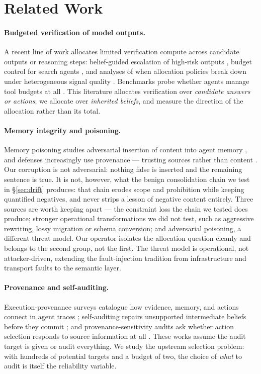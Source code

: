 \documentclass[11pt]{article}
\begin{document}
\section{Related Work}

\paragraph{Budgeted verification of model outputs.}
A recent line of work allocates limited verification compute across candidate
outputs or reasoning steps: belief-guided escalation of high-risk outputs
\citep{yuan2026belief}, budget control for search agents
\citep{fang2026budget}, and analyses of when allocation policies break down
under heterogeneous signal quality \citep{yang2026hetero}. Benchmarks probe
whether agents manage tool budgets at all \citep{wang2026allocbench,
lin2026bagen}. This literature allocates verification over \emph{candidate
answers or actions}; we allocate over \emph{inherited beliefs}, and measure
the direction of the allocation rather than its total.

\paragraph{Memory integrity and poisoning.}
Memory poisoning studies adversarial insertion of content into agent memory
\citep{dash2026untrusted, xie2026memevobench}, and defenses increasingly use
provenance --- trusting sources rather than content \citep{singh2026belief}.
Our corruption is not adversarial: nothing false is inserted and the remaining
sentence is true. It is not, however, what the benign consolidation chain we
test in \S\ref{sec:drift} produces: that chain erodes scope and prohibition
while keeping quantified negatives, and never strips a lesson of negative
content entirely. Three sources are worth keeping apart --- the constraint loss
the chain we tested does produce; stronger operational transformations we did
not test, such as aggressive rewriting, lossy migration or schema conversion;
and adversarial poisoning, a different threat model. Our operator isolates the
allocation question cleanly and belongs to the second group, not the first. The
threat model is operational, not attacker-driven, extending the fault-injection tradition
\citep{tan2026agentchaos} from infrastructure and transport faults to the
semantic layer.

\paragraph{Provenance and self-auditing.}
Execution-provenance surveys catalogue how evidence, memory, and actions
connect in agent traces \citep{wang2026traces}; self-auditing repairs
unsupported intermediate beliefs before they commit \citep{yuan2026verify};
and provenance-sensitivity audits ask whether action selection responds to
source information at all \citep{liao2026auditing}. These works assume the
audit target is given or audit everything. We study the upstream selection
problem: with hundreds of potential targets and a budget of two, the choice of
\emph{what} to audit is itself the reliability variable.
\end{document}

